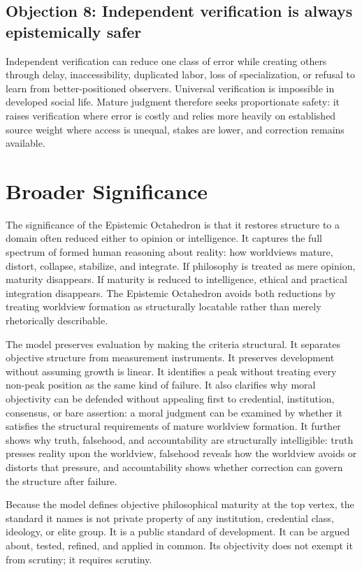 \documentclass[11pt]{article}
\begin{document}
\subsection{Objection 8: Independent verification is always epistemically safer}
Independent verification can reduce one class of error while creating others through delay, inaccessibility, duplicated labor, loss of specialization, or refusal to learn from better-positioned observers. Universal verification is impossible in developed social life. Mature judgment therefore seeks proportionate safety: it raises verification where error is costly and relies more heavily on established source weight where access is unequal, stakes are lower, and correction remains available.

\section{Broader Significance}

The significance of the Epistemic Octahedron is that it restores structure to a domain often reduced either to opinion or intelligence. It captures the full spectrum of formed human reasoning about reality: how worldviews mature, distort, collapse, stabilize, and integrate. If philosophy is treated as mere opinion, maturity disappears. If maturity is reduced to intelligence, ethical and practical integration disappears. The Epistemic Octahedron avoids both reductions by treating worldview formation as structurally locatable rather than merely rhetorically describable.

The model preserves evaluation by making the criteria structural. It separates objective structure from measurement instruments. It preserves development without assuming growth is linear. It identifies a peak without treating every non-peak position as the same kind of failure. It also clarifies why moral objectivity can be defended without appealing first to credential, institution, consensus, or bare assertion: a moral judgment can be examined by whether it satisfies the structural requirements of mature worldview formation. It further shows why truth, falsehood, and accountability are structurally intelligible: truth presses reality upon the worldview, falsehood reveals how the worldview avoids or distorts that pressure, and accountability shows whether correction can govern the structure after failure.

Because the model defines objective philosophical maturity at the top vertex, the standard it names is not private property of any institution, credential class, ideology, or elite group. It is a public standard of development. It can be argued about, tested, refined, and applied in common. Its objectivity does not exempt it from scrutiny; it requires scrutiny.
\end{document}
